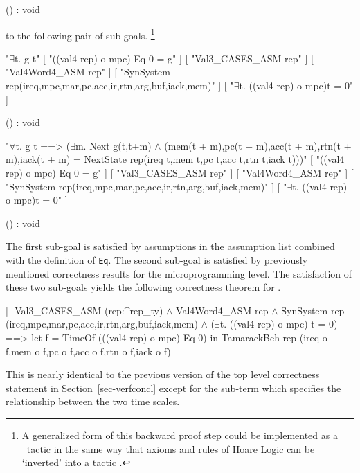 () : void
\endtt

\noindent
to the following pair of sub-goals.
\footnote{
A generalized form of this backward proof step could be implemented
as a \HOL\ tactic in the same way that axioms and rules of Hoare Logic
can be `inverted' into a tactic \cite{Gordon:banff87}.}

\begintt
"\(\exists\)t. g t"
    [ "((val4 rep) o mpc) Eq 0 = g" ]
    [ "Val3_CASES_ASM rep" ]
    [ "Val4Word4_ASM rep" ]
    [ "SynSystem rep(ireq,mpc,mar,pc,acc,ir,rtn,arg,buf,iack,mem)" ]
    [ "\(\exists\)t. ((val4 rep) o mpc)t = 0" ]

() : void
\endtt

\begintt
"\(\forall\)t.
  g t ==>
  (\(\exists\)m.
    Next g(t,t+m) \(\wedge\)
    (mem(t + m),pc(t + m),acc(t + m),rtn(t + m),iack(t + m) =
     NextState rep(ireq t,mem t,pc t,acc t,rtn t,iack t)))"
    [ "((val4 rep) o mpc) Eq 0 = g" ]
    [ "Val3_CASES_ASM rep" ]
    [ "Val4Word4_ASM rep" ]
    [ "SynSystem rep(ireq,mpc,mar,pc,acc,ir,rtn,arg,buf,iack,mem)" ]
    [ "\(\exists\)t. ((val4 rep) o mpc)t = 0" ]

() : void
\endtt

The first sub-goal is satisfied by assumptions in the assumption list
combined with the definition of \verb"Eq".
The second sub-goal is satisfied by
previously mentioned correctness results for
the microprogramming level.
The satisfaction of these two sub-goals yields
the following correctness theorem for \Tamarack.

\begintt
|- Val3_CASES_ASM (rep:^rep_ty) \(\wedge\)
   Val4Word4_ASM rep \(\wedge\)
   SynSystem rep (ireq,mpc,mar,pc,acc,ir,rtn,arg,buf,iack,mem) \(\wedge\)
   (\(\exists\)t. ((val4 rep) o mpc) t = 0)
   ==>
   let f = TimeOf (((val4 rep) o mpc) Eq 0) in
   TamarackBeh rep (ireq o f,mem o f,pc o f,acc o f,rtn o f,iack o f)
\endtt

This is nearly
identical to the previous version of the top level correctness
statement in Section~\ref{sec-verfconcl}
except for the sub-term which specifies the relationship
between the two time scales.

